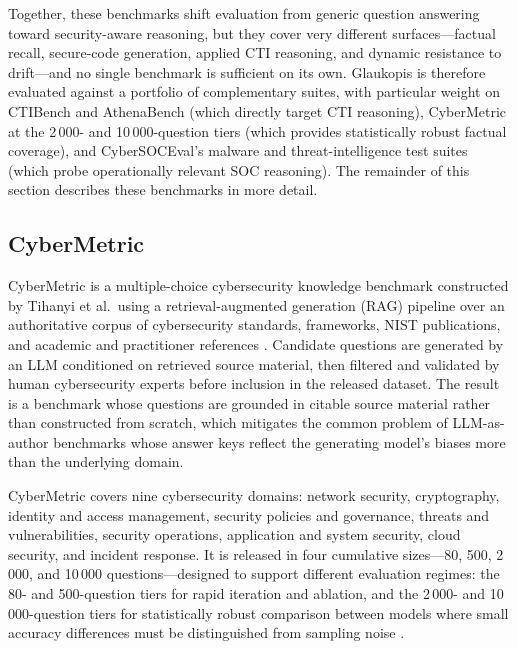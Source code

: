 \documentclass[unnumsec,webpdf,contemporary,large]{oup-authoring-template}
\theoremstyle{thmstyleone}
\theoremstyle{thmstyletwo}
\theoremstyle{thmstylethree}
\begin{document}
Together, these benchmarks shift evaluation from generic question answering toward security-aware reasoning, but they cover very different surfaces---factual recall, secure-code generation, applied CTI reasoning, and dynamic resistance to drift---and no single benchmark is sufficient on its own. Glaukopis is therefore evaluated against a portfolio of complementary suites, with particular weight on CTIBench and AthenaBench (which directly target CTI reasoning), CyberMetric at the 2\,000- and 10\,000-question tiers (which provides statistically robust factual coverage), and CyberSOCEval's malware and threat-intelligence test suites (which probe operationally relevant SOC reasoning). The remainder of this section describes these benchmarks in more detail.

\subsection{CyberMetric}
\label{sec:cybermetric}

CyberMetric is a multiple-choice cybersecurity knowledge benchmark constructed by Tihanyi et al.\ using a retrieval-augmented generation (RAG) pipeline over an authoritative corpus of cybersecurity standards, frameworks, NIST publications, and academic and practitioner references \cite{tihanyi2024cybermetric}. Candidate questions are generated by an LLM conditioned on retrieved source material, then filtered and validated by human cybersecurity experts before inclusion in the released dataset. The result is a benchmark whose questions are grounded in citable source material rather than constructed from scratch, which mitigates the common problem of LLM-as-author benchmarks whose answer keys reflect the generating model's biases more than the underlying domain.

CyberMetric covers nine cybersecurity domains: network security, cryptography, identity and access management, security policies and governance, threats and vulnerabilities, security operations, application and system security, cloud security, and incident response. It is released in four cumulative sizes---80, 500, 2\,000, and 10\,000 questions---designed to support different evaluation regimes: the 80- and 500-question tiers for rapid iteration and ablation, and the 2\,000- and 10\,000-question tiers for statistically robust comparison between models where small accuracy differences must be distinguished from sampling noise \cite{tihanyi2024cybermetric}.
\end{document}
